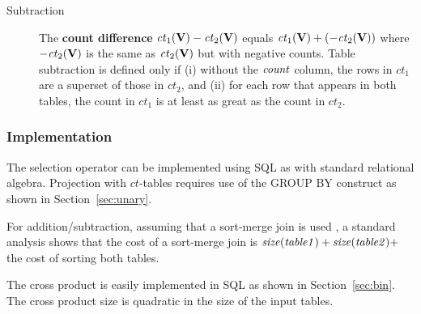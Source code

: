 \documentclass{sig-alternate-2013}
\newcommand{\ct}{\mathit{ct}}
\begin{document}
\begin{description}
\item[Subtraction] %
The \textbf{count difference} $\ct_{1}(\set{V}) - \ct_{2}(\set{V})$ equals $\ct_{1}(\set{V}) + (- \ct_{2}(\set{V}))$ where $- \ct_{2}(\set{V})$ is the same as $\ct_{2}(\set{V})$ but with negative counts. 
Table subtraction is defined only if (i) without the $\it{count}$ column, the rows in $\ct_{1}$ are a superset of those in $\ct_{2}$, and (ii) for each row that appears in both tables, the count in $\ct_{1}$ is at least as great as the count in $\ct_{2}$.
\end{description}


\subsubsection{Implementation}\label{sec:imp}



The selection operator can be implemented  using SQL as with standard relational algebra. 
Projection with $\ct$-tables requires use of the GROUP BY construct as shown in Section~\ref{sec:unary}. 

For addition/subtraction, assuming that a sort-merge join is used \cite{Ullman1982}, a standard analysis shows that the cost of a sort-merge join is $\it{size}(table1) + \it{size}(table2) +$ the cost of sorting both tables. 


The cross product is easily implemented in SQL as shown in Section~\ref{sec:bin}. The cross product size is quadratic in the size of the input tables.
\end{document}
